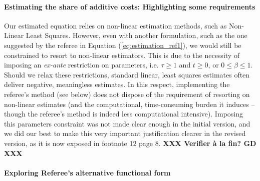 \documentclass[a4paper,11pt]{article}
\begin{document}
\paragraph{Estimating the share of additive costs: Highlighting some requirements} Our estimated equation relies on non-linear estimation methods, such as Non-Linear Least Squares. However, even with another formulation, such as the one suggested by the referee in Equation (\ref{eq:estimation_ref1}), we would still be constrained to resort to non-linear estimators. This is due to the necessity of imposing an \textit{ex-ante} restriction on parameters, i.e. $\tau \geq 1$ and $t \geq 0$, or $0 \leq  \beta \leq 1$. Should we relax these restrictions, standard linear, least squares estimates often deliver negative, meaningless estimates. In this respect, implementing the referee's method (see below) does not dispose of the requirement of resorting on non-linear estimates (and the computational, time-consuming burden it induces -- though the referee’s method is indeed less computational intensive). Imposing this parameters constraint was not made clear enough in the initial version, and we did our best to make this very important justification clearer in the revised version, as it is now exposed in footnote 12 page 8. \textbf{XXX Verifier à la fin? GD XXX }\smallskip



\paragraph{Exploring Referee's alternative functional form \label{subsec:functional_form}}
\end{document}
